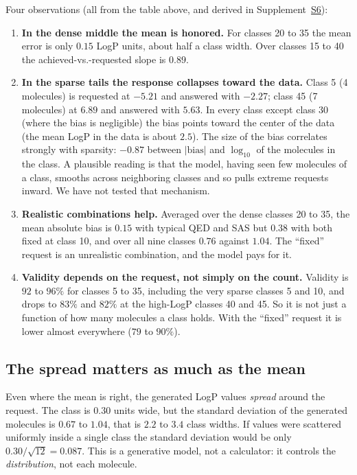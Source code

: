 \documentclass[11pt]{article}
\begin{document}
Four observations (all from the table above, and derived in Supplement~\hyperref[sec:S6]{S6}):
\begin{enumerate}[nosep]
  \item \textbf{In the dense middle the mean is honored.} For classes 20 to 35 the mean error is only $0.15$ LogP units, about half a class width. Over classes 15 to 40 the achieved-vs.-requested slope is $0.89$.
  \item \textbf{In the sparse tails the response collapses toward the data.} Class 5 (4 molecules) is requested at $-5.21$ and answered with $-2.27$; class 45 (7 molecules) at $6.89$ and answered with $5.63$. In every class except class 30 (where the bias is negligible) the bias points toward the center of the data (the mean LogP in the data is about $2.5$). The size of the bias correlates strongly with sparsity: $-0.87$ between $|\text{bias}|$ and $\log_{10}$ of the molecules in the class. A plausible reading is that the model, having seen few molecules of a class, smooths across neighboring classes and so pulls extreme requests inward. We have not tested that mechanism.
  \item \textbf{Realistic combinations help.} Averaged over the dense classes 20 to 35, the mean absolute bias is $0.15$ with typical QED and SAS but $0.38$ with both fixed at class 10, and over all nine classes $0.76$ against $1.04$. The ``fixed'' request is an unrealistic combination, and the model pays for it.
  \item \textbf{Validity depends on the request, not simply on the count.} Validity is $92$ to $96\%$ for classes 5 to 35, including the very sparse classes 5 and 10, and drops to $83\%$ and $82\%$ at the high-LogP classes 40 and 45. So it is not just a function of how many molecules a class holds. With the ``fixed'' request it is lower almost everywhere ($79$ to $90\%$).
\end{enumerate}

\subsection*{The spread matters as much as the mean}
Even where the mean is right, the generated LogP values \emph{spread} around the request. The class is $0.30$ units wide, but the standard deviation of the generated molecules is $0.67$ to $1.04$, that is $2.2$ to $3.4$ class widths. If values were scattered uniformly inside a single class the standard deviation would be only $0.30/\sqrt{12}=0.087$. This is a generative model, not a calculator: it controls the \emph{distribution}, not each molecule.
\end{document}
